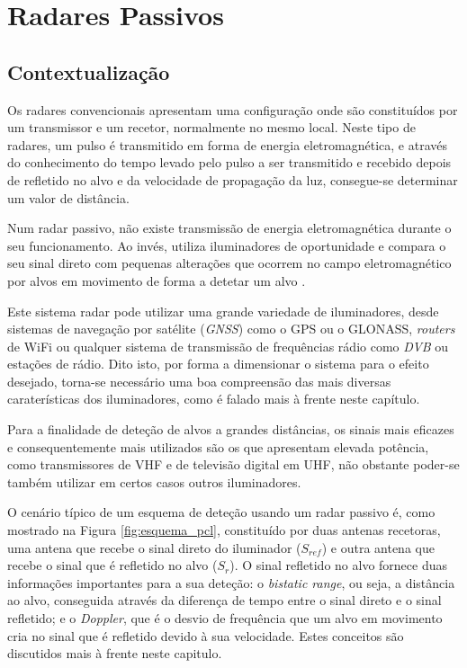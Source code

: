 
\chapter{Radares Passivos} %

\label{chap:Chapter2} %


\section{Contextualização} \label{contextualização}
Os radares convencionais apresentam uma configuração onde são constituídos por um transmissor e um recetor, normalmente no mesmo local. Neste tipo de radares, um pulso é transmitido em forma de energia eletromagnética, e através do conhecimento do tempo levado pelo pulso a ser transmitido e recebido depois de refletido no alvo e da velocidade de propagação da luz, consegue-se determinar um valor de distância.\par 
Num radar passivo, não existe transmissão de energia eletromagnética durante o seu funcionamento. Ao invés, utiliza iluminadores de oportunidade e compara o seu sinal direto com pequenas alterações que ocorrem no campo eletromagnético por alvos em movimento de forma a detetar um alvo \parencite{Griffiths2017}.\par 
Este sistema radar pode utilizar uma grande variedade de iluminadores, desde sistemas de navegação por satélite (\textit{\gls{GNSS}}) como o \gls{GPS} ou o GLONASS, \textit{routers} de WiFi ou qualquer sistema de transmissão de frequências rádio como \textit{\gls{DVB}} ou estações de rádio. Dito isto, por forma a dimensionar o sistema para o efeito desejado, torna-se necessário uma boa compreensão das mais diversas caraterísticas dos iluminadores, como é falado mais à frente neste capítulo.\par 
Para a finalidade de deteção de alvos a grandes distâncias, os sinais mais eficazes e consequentemente mais utilizados são os que apresentam elevada potência, como transmissores de \gls{VHF} e de televisão digital em \gls{UHF}, não obstante poder-se também utilizar em certos casos outros iluminadores.\par
O cenário típico de um esquema de deteção usando um radar passivo é, como mostrado na Figura \ref{fig:esquema_pcl}, constituído por duas antenas recetoras, uma antena que recebe o sinal direto do iluminador ($S_{ref}$) e outra antena que recebe o sinal que é refletido no alvo ($S_{r}$). O sinal refletido no alvo fornece duas informações importantes para a sua deteção: o \textit{bistatic range}, ou seja, a distância ao alvo, conseguida através da diferença de tempo entre o sinal direto e o sinal refletido; e o \textit{Doppler}, que é o desvio de frequência que um alvo em movimento cria no sinal que é refletido devido à sua velocidade. Estes conceitos são discutidos mais à frente neste capitulo. \par

